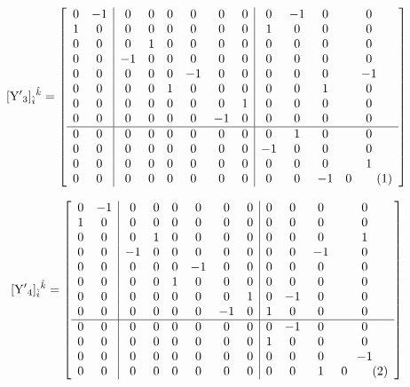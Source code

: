 \documentclass[12pt]{article}
\newcommand\numberthis{\addtocounter{equation}{1}\tag{\theequation}}
\let\bm\relax
\newcommand{\bm}[1]{{\boldsymbol{#1}}}
\begin{document}
\[[{\bm{\rm Y'}_3}]_{\hat i}{}^{\hat k}= 
\left[\begin{array}{cc|cccccc|cccc}
 0 & -1 & 0 & 0 & 0 & 0 & 0 & 0 & 0 & -1 & 0 & 0 \\
 1 & 0 & 0 & 0 & 0 & 0 & 0 & 0 & 1 & 0 & 0 & 0 \\
 0 & 0 & 0 & 1 & 0 & 0 & 0 & 0 & 0 & 0 & 0 & 0 \\
 0 & 0 & -1 & 0 & 0 & 0 & 0 & 0 & 0 & 0 & 0 & 0 \\
 0 & 0 & 0 & 0 & 0 & -1 & 0 & 0 & 0 & 0 & 0 & -1 \\
 0 & 0 & 0 & 0 & 1 & 0 & 0 & 0 & 0 & 0 & 1 & 0 \\
 0 & 0 & 0 & 0 & 0 & 0 & 0 & 1 & 0 & 0 & 0 & 0 \\
 0 & 0 & 0 & 0 & 0 & 0 & -1 & 0 & 0 & 0 & 0 & 0 \\
 \hline
 0 & 0 & 0 & 0 & 0 & 0 & 0 & 0 & 0 & 1 & 0 & 0 \\
 0 & 0 & 0 & 0 & 0 & 0 & 0 & 0 & -1 & 0 & 0 & 0 \\
 0 & 0 & 0 & 0 & 0 & 0 & 0 & 0 & 0 & 0 & 0 & 1 \\
 0 & 0 & 0 & 0 & 0 & 0 & 0 & 0 & 0 & 0 & -1 & 0 
\numberthis\end{array}\right] \]

\[[{\bm{\rm Y'}_4}]_{\hat i}{}^{\hat k}= 
\left[\begin{array}{cc|cccccc|cccc}
 0 & -1 & 0 & 0 & 0 & 0 & 0 & 0 & 0 & 0 & 0 & 0 \\
 1 & 0 & 0 & 0 & 0 & 0 & 0 & 0 & 0 & 0 & 0 & 0 \\
 0 & 0 & 0 & 1 & 0 & 0 & 0 & 0 & 0 & 0 & 0 & 1 \\
 0 & 0 & -1 & 0 & 0 & 0 & 0 & 0 & 0 & 0 & -1 & 0 \\
 0 & 0 & 0 & 0 & 0 & -1 & 0 & 0 & 0 & 0 & 0 & 0 \\
 0 & 0 & 0 & 0 & 1 & 0 & 0 & 0 & 0 & 0 & 0 & 0 \\
 0 & 0 & 0 & 0 & 0 & 0 & 0 & 1 & 0 & -1 & 0 & 0 \\
 0 & 0 & 0 & 0 & 0 & 0 & -1 & 0 & 1 & 0 & 0 & 0 \\
 \hline
 0 & 0 & 0 & 0 & 0 & 0 & 0 & 0 & 0 & -1 & 0 & 0 \\
 0 & 0 & 0 & 0 & 0 & 0 & 0 & 0 & 1 & 0 & 0 & 0 \\
 0 & 0 & 0 & 0 & 0 & 0 & 0 & 0 & 0 & 0 & 0 & -1 \\
 0 & 0 & 0 & 0 & 0 & 0 & 0 & 0 & 0 & 0 & 1 & 0
\numberthis\end{array}\right] \]
\end{document}
